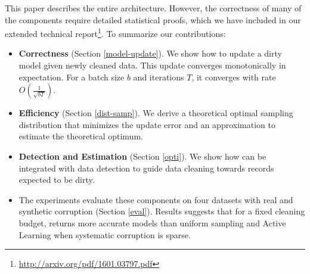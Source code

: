 This paper describes the entire \sys architecture. However, the correctness of many of the components require detailed statistical proofs, which we have included in our extended technical report\footnote{\url{http://arxiv.org/pdf/1601.03797.pdf}}. To summarize our contributions:
\begin{itemize}[noitemsep]
\item \textbf{Correctness} (Section \ref{model-update}). We show how to update a dirty model given newly cleaned data. This update converges monotonically in expectation. For a batch size $b$ and iterations $T$, it converges with rate $O(\frac{1}{\sqrt{bT}})$. 
\item \textbf{Efficiency} (Section \ref{dist-samp}). We derive a theoretical optimal sampling distribution that minimizes the update error and an approximation to estimate the theoretical optimum.
\item \textbf{Detection and Estimation} (Section \ref{opti}). We show how \sys can be integrated with data detection to guide data cleaning towards records expected to be dirty.
\item The experiments evaluate these components on four datasets with real and synthetic corruption (Section \ref{eval}). Results suggests that for a fixed cleaning budget, \sys returns more accurate models than uniform sampling and Active Learning when systematic corruption is sparse.

\end{itemize}






